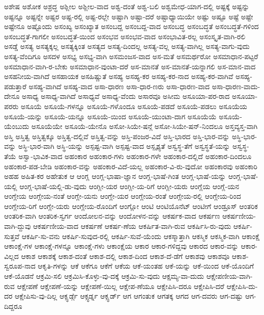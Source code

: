 {ಅಶೇಷ
ಅಶೋಕ
ಅಶ್ರದ್ಧ
ಅಶ್ಲೀಲ
ಅಶ್ಲೀಲ-ವಾದ
ಅಶ್ವ-ದಂತೆ
ಅಶ್ವ-ಬಲಿ
ಅಶ್ವಮೇಧ-ಯಾಗ-ದಲ್ಲಿ
ಅಷ್ಟಕ್ಕೆ
ಅಷ್ಟನ್ನು
ಅಷ್ಟನ್ನೂ
ಅಷ್ಟನ್ನೇ
ಅಷ್ಟರ
ಅಷ್ಟ-ರಲ್ಲಿ
ಅಷ್ಟ-ರಲ್ಲೇ
ಅಷ್ಟಾಗಿ
ಅಷ್ಟಾ-ದರೆ
ಅಷ್ಟಾಧ್ಯಾಯಿಯೇ
ಅಷ್ಟು
ಅಷ್ಟೂ
ಅಷ್ಟೆ
ಅಷ್ಟೇ
ಅಷ್ಟೇನೂ
ಅಷ್ಟೊಂದು
ಅಸಂಖ್ಯ
ಅಸಂಖ್ಯಾತ
ಅಸಂಬದ್ದ
ಅಸಂಬದ್ದ-ವಾದ
ಅಸಂಬದ್ಧ
ಅಸಂಬದ್ಧತೆ
ಅಸಂಬದ್ಧತೆ-ಗಳಿಂದ
ಅಸಂಬದ್ಧತೆ-ಗಾಗಲೀ
ಅಸಂಬದ್ಧತೆ-ಯಿಂದ
ಅಸಂಭವ
ಅಸಂಭವ-ವಾದ
ಅಸಂಭಾವಿತ-ರಲ್ಲ
ಅಸಂಸ್ಕೃತ-ವಾಗಿ-ರಲಿ
ಅಸಡ್ಡೆ
ಅಸತ್ಯ
ಅಸತ್ಯಕ್ಕಲ್ಲ
ಅಸತ್ಯಕ್ಕಿಂತ
ಅಸತ್ಯದ
ಅಸತ್ಯ-ದಿಂದಲ್ಲ
ಅಸತ್ಯ-ವಲ್ಲ
ಅಸತ್ಯ-ವಾಗಿಲ್ಲ
ಅಸತ್ಯ-ವಾಗು-ವುದು
ಅಸತ್ಯ-ವೆಂದಿಗೂ
ಅಸದಳ
ಅಸಭ್ಯ
ಅಸಭ್ಯ-ವಾಗಿ
ಅಸಮಂಜಸ-ವಾದ
ಅಸ-ಮತೆ
ಅಸಮರ್ಥರೋ
ಅಸಮಾಧಾನ-ಪಟ್ಟರೆ
ಅಸಮಾಧಾನ-ವಾಗಿ-ರ-ಬೇಕು
ಅಸಮಾಧಾನ-ವುಂಟಾ-ದರೆ
ಅಸ-ಮಾನತೆ
ಅಸ-ಮಾನತೆ-ಯನ್ನಾಗಲಿ
ಅಸ-ಮಾನ-ವಾದ
ಅಸಹನೀಯ-ವಾಗಿದೆ
ಅಸಹಾಯಕ
ಅಸಹಿಷ್ಣುತೆ
ಅಸಹ್ಯ
ಅಸಹ್ಯ-ಕರ
ಅಸಹ್ಯ-ಕರ-ನಾದ
ಅಸಹ್ಯ-ಕರ-ವಾಗಿವೆ
ಅಸಹ್ಯ-ಪಡುತ್ತಾರೆ
ಅಸಹ್ಯ-ವಾಗಿದೆ
ಅಸಹ್ಯ-ವಾದ
ಅಸಾ-ಧಾರಣ
ಅಸಾ-ಧಾರ-ಣರು
ಅಸಾ-ಧಾರಣ-ವಾದ
ಅಸಾ-ಧಾರಣ-ವಾದು-ದೇನೂ
ಅಸಾಧ್ಯ
ಅಸಾಧ್ಯ-ವಾಗಿದೆ
ಅಸಾಧ್ಯವೆ
ಅಸಾಧ್ಯ-ವೆಂದು
ಅಸಾರವೂ
ಅಸೀಮ
ಅಸೂಯಾ-ಪರ-ರಾದ
ಅಸೂಯಾ-ಪರರು
ಅಸೂಯೆ
ಅಸೂಯೆ-ಗಳನ್ನೂ
ಅಸೂಯೆ-ಗಳೊಂದೂ
ಅಸೂಯೆ-ಪಡದೆ
ಅಸೂಯೆ-ಪಡಲು
ಅಸೂಯೆಯ
ಅಸೂಯೆ-ಯನ್ನು
ಅಸೂಯೆ-ಯನ್ನೂ
ಅಸೂಯೆ-ಯಿಂದ
ಅಸೂಯೆ-ಯುಂಟಾ-ದಾಗ
ಅಸೂಯೆಯೆ
ಅಸೂಯೆ-ಯೆಂಬುದು
ಅಸೂಯೆಯೇ
ಅಸೂಯೆ-ಯೇನೊ
ಅಸೋ-ಸಿಯೇ-ಷನ್ಗೆ
ಅಸೋ-ಸಿಯೇ-ಷನ್-ನಿಂದಲೂ
ಅಸ್ತವ್ಯಸ್ತ-ವಾಗಿ
ಅಸ್ತಿ
ಅಸ್ತಿತ್ವ
ಅಸ್ತಿತ್ವಕ್ಕೂ
ಅಸ್ತಿತ್ವ-ದಲ್ಲಿವೆ
ಅಸ್ತಿತ್ವ-ವನ್ನು
ಅಸ್ತಿ-ಪಂಜರ-ವಿದೆ
ಅಸ್ತಿ-ಭಾರದ
ಅಸ್ತಿ-ಭಾರ-ವನ್ನು
ಅಸ್ಥಿ-ಭಾರ-ವನ್ನು
ಅಸ್ಥಿ-ಭಾರ-ವಾಗಿ
ಅಸ್ಥಿ-ಯನ್ನು
ಅಸ್ಪಷ್ಟ-ವಾಗಿ
ಅಸ್ಪಷ್ಟ-ವಾದ
ಅಸ್ಪೃಶ್ಯತೆ
ಅಸ್ವಸ್ಥ-ತೆಗೆ
ಅಸ್ವಸ್ಥತೆ-ಯನ್ನು
ಅಸ್ವಸ್ಥ-ತೆಯೆ
ಅಸ್ವಾ-ಭಾವಿಕ-ವಾದ
ಅಹಂಕಾರ
ಅಹಂಕಾರ-ಗಳು
ಅಹಂಕಾರ-ಗಳೇ
ಅಹಂಕಾರ-ದಲ್ಲಿದೆ
ಅಹಂಕಾರ-ದಿಂದಲೂ
ಅಹಂಕಾರ-ಪಡ-ಬೇಡಿ
ಅಹಂಕಾರ-ವನ್ನು
ಅಹಂಕಾರ-ವಿದೆ-ಯಲ್ಲ
ಅಹಂಕಾರ-ವಿ-ರು-ವುದೋ
ಅಹಂಕಾರವು
ಅಹಂಕಾರಿ
ಅಹಹ
ಅಹಿತ-ಕರ
ಅಹೇತುಕ
ಆ
ಆಂಗ್ಲ
ಆಂಗ್ಲ-ಭಾಷಾ-ಜ್ಞಾನ
ಆಂಗ್ಲ-ಭಾಷೆ-ಗಿಂತ
ಆಂಗ್ಲ-ಭಾಷೆ-ಯನ್ನು
ಆಂಗ್ಲ-ಭಾಷೆ-ಯಲ್ಲಿ
ಆಂಗ್ಲ-ಭಾಷೆ-ಯಲ್ಲಿ-ಡು-ವುದು
ಆಂಗ್ಲೀ-ಯರ
ಆಂಗ್ಲೀ-ಯ-ರಿಗೆ
ಆಂಗ್ಲೀ-ಯರು
ಆಂಗ್ಲೆಯ
ಆಂಗ್ಲೆ-ಯನ
ಆಂಗ್ಲೇಯ
ಆಂಗ್ಲೇಯ-ನಂತೆ
ಆಂಗ್ಲೇ-ಯನು
ಆಂಗ್ಲೇ-ಯರ
ಆಂಗ್ಲೇಯ-ರಂತೆ
ಆಂಗ್ಲೇಯ-ರಲ್ಲಿ
ಆಂಗ್ಲೇಯ-ರಿಂದ
ಆಂಗ್ಲೇಯ-ರಿಗೆ
ಆಂಗ್ಲೇ-ಯರು
ಆಂಗ್ಲೇಯ-ರೊಂದಿಗೆ
ಆಂಗ್ಲೋ
ಆಂಟಿ
ಆಂಟಿಯೊನೆಟ್
ಆಂಟೀಗೆ
ಆಂಡ್ರೂಸ್
ಆಂತರಿಕ
ಆಂತರಿಕ-ವಾಗಿ
ಆಂತರಿಕ-ಸ್ವರ್ಗ
ಆಂದೋಲನ-ವನ್ನು
ಆಂದೋಳನ-ವನ್ನು
ಆಕರ್ಷಕ-ವಾದ
ಆಕರ್ಷಣ
ಆಕರ್ಷಣೀಯ-ವಾಗಿ-ದ್ದುವು
ಆಕರ್ಷಣೀಯ-ವಾದ
ಆಕರ್ಷಣೆ
ಆಕರ್ಷ-ಣೆಯ
ಆಕರ್ಷಿತ-ವಾಗಿ-ರುವ
ಆಕರ್ಷಿಸಿ-ರು-ವುದು
ಆಕರ್ಷಿ-ಸುತ್ತವೆ
ಆಕರ್ಷಿ-ಸು-ವನು
ಆಕರ್ಷಿ-ಸುವುದ-ರಲ್ಲಿ
ಆಕರ್ಷಿ-ಸುವೆ-ಯೆಂದು
ಆಕಸ್ಮಾತ್ತಾಗಿ
ಆಕಸ್ಮಿಕ
ಆಕಸ್ಮಿಕ-ವಾಗಿ
ಆಕಾಂಕ್ಷೆ
ಆಕಾಂಕ್ಷೆ-ಗಳ
ಆಕಾಂಕ್ಷೆ-ಗಳನ್ನೂ
ಆಕಾಂಕ್ಷೆ-ಗಳು
ಆಕಾಂಕ್ಷೆಯ
ಆಕಾರ
ಆಕಾರ-ಗಳಿದ್ದವು
ಆಕಾರದ
ಆಕಾರ-ವನ್ನು
ಆಕಾರ-ವಿಲ್ಲದ
ಆಕಾಶ
ಆಕಾಶಕ್ಕೆ
ಆಕಾಶ-ದಂತೆ
ಆಕಾಶ-ದಲ್ಲಿ
ಆಕಾಶ-ದಿಂದ
ಆಕಾಶ-ದೆ-ಡೆಗೆ
ಆಕಾಶವು
ಆಕಾಶವೂ
ಆಕಾಶ-ಸ್ವರೂಪ-ನಾದ
ಆಕೃತಿ-ಗಳನ್ನು
ಆಕೆ
ಆಕೆಗೂ
ಆಕೆಗೆ
ಆಕೆಯ
ಆಕೆ-ಯಂತಹ
ಆಕೆ-ಯನ್ನು
ಆಕೆ-ಯಿಂದ
ಆಕೆ-ಯೊಂದಿಗೆ
ಆಕೆ-ಯೊಡನೆ
ಆಕ್ರಮಿ-ಸಲಿ
ಆಕ್ರಮಿಸಿ-ಕೊಳ್ಳು-ವು-ದಕ್ಕೆ
ಆಕ್ರಮಿ-ಸು-ವುದು
ಆಕ್ಷಮ್ಯ-ವಾ-ದುದು
ಆಕ್ಷೇಪಣೀಯ-ವಾಗಿ-ರುವ
ಆಕ್ಷೇಪಣೆ
ಆಕ್ಷೇಪಣೆ-ಯನ್ನು
ಆಕ್ಷೇಪಣೆ-ಯಿಲ್ಲ
ಆಕ್ಷೇಪ-ಣೆಯೂ
ಆಕ್ಷೇಪಿಸಿ-ದರೂ
ಆಕ್ಷೇಪಿಸಿ-ದರೆ
ಆಕ್ಷೇಪಿಸಿ-ದು-ದರ
ಆಕ್ಷೇಪಿಸು-ವು-ದಿಲ್ಲ
ಆಕ್ಸ್ಫರ್ಡ್ಗೆ
ಆಕ್ಸ್ಫರ್ಡ್ನ
ಆಕ್ಸ್ಫರ್ಡ್
ಆಗ
ಆಗಂತುಕ
ಆಗತಕ್ಕ
ಆಗದ
ಆಗ-ದವರು
ಆಗ-ದಷ್ಟು
ಆಗ-ದಿದ್ದರೂ
}
